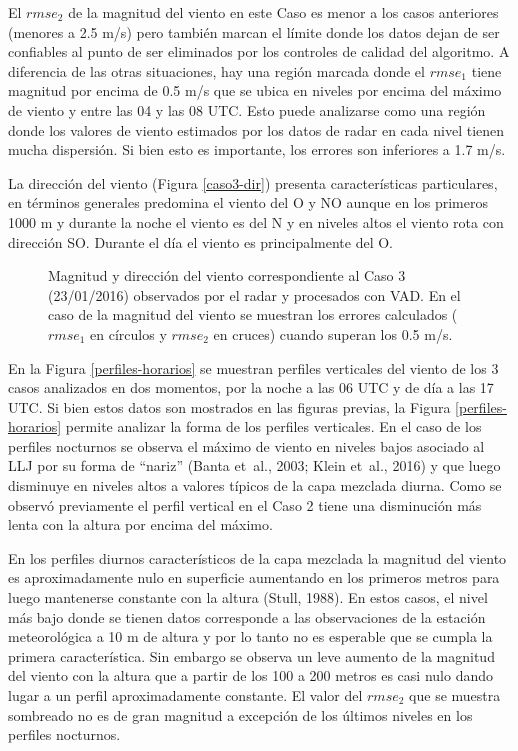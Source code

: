 \documentclass[12pt,spanish,oneside]{book}
\begin{document}
El \(rmse_2\) de la magnitud del viento en este Caso es menor a los
casos anteriores (menores a 2.5 m/s) pero también marcan el límite donde
los datos dejan de ser confiables al punto de ser eliminados por los
controles de calidad del algoritmo. A diferencia de las otras
situaciones, hay una región marcada donde el \(rmse_1\) tiene magnitud
por encima de 0.5 m/s que se ubica en niveles por encima del máximo de
viento y entre las 04 y las 08 UTC. Esto puede analizarse como una
región donde los valores de viento estimados por los datos de radar en
cada nivel tienen mucha dispersión. Si bien esto es importante, los
errores son inferiores a 1.7 m/s.

La dirección del viento (Figura \ref{caso3-dir}) presenta
características particulares, en términos generales predomina el viento
del O y NO aunque en los primeros 1000 m y durante la noche el viento es
del N y en niveles altos el viento rota con dirección SO. Durante el día
el viento es principalmente del O.

\begin{figure}
\newline{}\caption{Magnitud y dirección del viento  correspondiente al Caso 3 (23/01/2016) observados por el radar y procesados con VAD. En el caso de la magnitud del viento se muestran los errores calculados ($rmse_1$ en círculos y $rmse_2$ en cruces) cuando superan los 0.5 m/s. \label{campo-caso3}}\label{fig:campo-caso3}
\end{figure}

En la Figura \ref{perfiles-horarios} se muestran perfiles verticales del
viento de los 3 casos analizados en dos momentos, por la noche a las 06
UTC y de día a las 17 UTC. Si bien estos datos son mostrados en las
figuras previas, la Figura \ref{perfiles-horarios} permite analizar la
forma de los perfiles verticales. En el caso de los perfiles nocturnos
se observa el máximo de viento en niveles bajos asociado al LLJ por su
forma de ``nariz'' (Banta et~al., 2003; Klein et~al., 2016) y que luego
disminuye en niveles altos a valores típicos de la capa mezclada diurna.
Como se observó previamente el perfil vertical en el Caso 2 tiene una
disminución más lenta con la altura por encima del máximo.

En los perfiles diurnos característicos de la capa mezclada la magnitud
del viento es aproximadamente nulo en superficie aumentando en los
primeros metros para luego mantenerse constante con la altura (Stull,
1988). En estos casos, el nivel más bajo donde se tienen datos
corresponde a las observaciones de la estación meteorológica a 10 m de
altura y por lo tanto no es esperable que se cumpla la primera
característica. Sin embargo se observa un leve aumento de la magnitud
del viento con la altura que a partir de los 100 a 200 metros es casi
nulo dando lugar a un perfil aproximadamente constante. El valor del
\(rmse_2\) que se muestra sombreado no es de gran magnitud a excepción
de los últimos niveles en los perfiles nocturnos.
\end{document}
